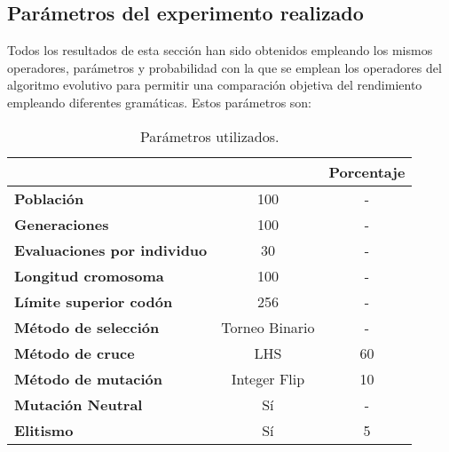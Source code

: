 \subsection{Parámetros del experimento realizado} \label{sec:params}
Todos los resultados de esta sección han sido obtenidos empleando los mismos operadores, parámetros y probabilidad con la que se emplean los operadores del algoritmo evolutivo para permitir una comparación objetiva del rendimiento empleando diferentes gramáticas. Estos parámetros son:
\begin{table}[H]
\centering
\begin{tabular}{lc|c|}
\cline{3-3}
\textbf{}                                                                & \multicolumn{1}{l|}{\textbf{}}     & \multicolumn{1}{l|}{\textbf{Porcentaje}} \\ \hline
\multicolumn{1}{|l|}{\textbf{Población}}                                 & 100                                & -                                        \\ \hline
\multicolumn{1}{|l|}{\textbf{Generaciones}}                              & 100                                & -                                        \\ \hline
\multicolumn{1}{|l|}{\textbf{Evaluaciones por individuo}}                & 30                                 & -                                        \\ \hline
\multicolumn{1}{|l|}{\textbf{Longitud cromosoma}}                        & 100                                & -                                        \\ \hline
\multicolumn{1}{|l|}{\textbf{Límite superior codón\footnotemark[2]}} & 256                                & -                                        \\ \hline
\multicolumn{1}{|l|}{\textbf{Método de selección}}                       & Torneo Binario\footnotemark[3] & -                                        \\ \hline
\multicolumn{1}{|l|}{\textbf{Método de cruce}}                           & LHS                                & 60                                       \\ \hline
\multicolumn{1}{|l|}{\textbf{Método de mutación}}                        & Integer Flip                       & 10                                       \\ \hline
\multicolumn{1}{|l|}{\textbf{Mutación Neutral}}                          & Sí                                 & -                                        \\ \hline
\multicolumn{1}{|l|}{\textbf{Elitismo}}                                  & Sí                                 & 5                                        \\ \hline
\end{tabular}
\caption{Parámetros utilizados.}
\label{table:best-params-grams}
\end{table}

